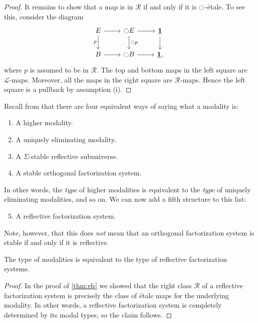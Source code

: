 \documentclass[9pt,twosided]{amsart}
\begin{document}
\begin{proof}
  It remains to show that a map is in $\mathcal{R}$ if and only if it is ${\ocircle}$-\'etale. To see this, consider the diagram
  \begin{equation*}
    \begin{tikzcd}
      E \arrow[d,swap,"p"] \arrow[r] & \modal E \arrow[d,"\modal p"] \arrow[r] & \unit \arrow[d] \\
      B \arrow[r] & \modal B \arrow[r] & \unit,
    \end{tikzcd}
  \end{equation*}
  where $p$ is assumed to be in $\mathcal{R}$. The top and bottom maps in the left square are $\mathcal{L}$-maps. Moreover, all the maps in the right square are $\mathcal{R}$-maps. Hence the left square is a pullback by assumption (i).
\end{proof}

Recall from \cite[Section 1]{RijkeSpittersShulman} that there are four equivalent ways of saying what a modality is:
\begin{enumerate}
\item A higher modality.
\item A uniquely eliminating modality.
\item A $\Sigma$-stable reflective subuniverse.
\item A stable orthogonal factorization system.
\end{enumerate}
In other words, the \emph{type} of higher modalities is equivalent to the \emph{type} of uniquely eliminating modalities, and so on. We can now add a fifth structure to this list:
\begin{enumerate}
  \setcounter{enumi}{4}
\item A reflective factorization system.
\end{enumerate}
Note, however, that this does \emph{not} mean that an orthogonal factorization system is stable if and only if it is reflective. 

\begin{thm}
  The type of modalities is equivalent to the type of reflective factorization systems.
\end{thm}

\begin{proof}
  In the proof of \cref{thm:rfs} we showed that the right class $\mathcal{R}$ of a reflective factorization system is precisely the class of \'etale maps for the underlying modality. In other words, a reflective factorization system is completely determined by its modal types, so the claim follows.
\end{proof}
\end{document}
